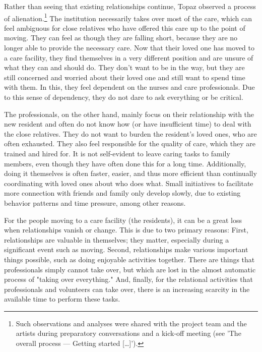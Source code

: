 \documentclass[authordate, empirical]{jote-new-article}
\begin{document}
	Rather than seeing that existing relationships continue, Topaz observed a process of alienation.\footnote{ Such observations and analyses were shared with the project team and the artists during preparatory conversations and a kick-off meeting (see 'The overall process --- Getting started […]').} The institution necessarily takes over most of the care, which can feel ambiguous for close relatives who have offered this care up to the point of moving. They can feel as though they are falling short, because they are no longer able to provide the necessary care. Now that their loved one has moved to a care facility, they find themselves in a very different position and are unsure of what they can and should do. They don't want to be in the way, but they are still concerned and worried about their loved one and still want to spend time with them. In this, they feel dependent on the nurses and care professionals. Due to this sense of dependency, they do not dare to ask everything or be critical.







	The professionals, on the other hand, mainly focus on their relationship with the new resident and often do not know how (or have insufficient time) to deal with the close relatives. They do not want to burden the resident's loved ones, who are often exhausted. They also feel responsible for the quality of care, which they are trained and hired for. It is not self-evident to leave caring tasks to family members, even though they have often done this for a long time. Additionally, doing it themselves is often faster, easier, and thus more efficient than continually coordinating with loved ones about who does what. Small initiatives to facilitate more connection with friends and family only develop slowly, due to existing behavior patterns and time pressure, among other reasons.







	For the people moving to a care facility (the residents), it can be a great loss when relationships vanish or change. This is due to two primary reasons: First, relationships are valuable in themselves; they matter, especially during a significant event such as moving. Second, relationships make various important things possible, such as doing enjoyable activities together. There are things that professionals simply cannot take over, but which are lost in the almost automatic process of "taking over everything." And, finally, for the relational activities that professionals and volunteers can take over, there is an increasing scarcity in the available time to perform these tasks.
\end{document}
